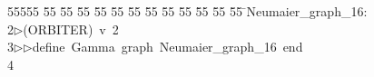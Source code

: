 %
%
\begin{tabbing}
55555 \= 55 \= 55 \= 55 \= 55 \= 55 \= 55 \= 55 \= 55 \= 55 \= 55 \= 55 \= 55 \= \>Neumaier\_graph\_16:\\[0pt]
2\>$\triangleright$\>(ORBITER)\ v\ 2\ \\[0pt]
3\>$\triangleright$\>$\triangleright$\>define\ Gamma\ graph\ Neumaier\_graph\_16\ end\ \\[0pt]
4\>\end{tabbing}
